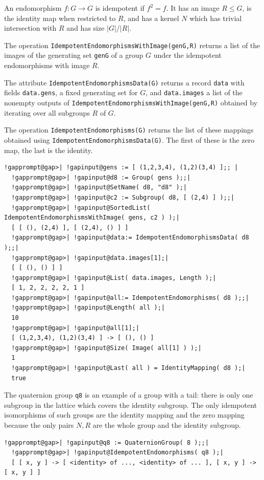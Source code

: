 \documentclass[a4paper,11pt]{report}
\begin{document}
{{{ An endomorphism $f\colon G \to G$ is idempotent if $f^2 = f$. It has an image $R \leq G$, is the identity map when restricted to $R$, and has a kernel $N$ which has trivial intersection with $R$ and has size $|G|/|R|$. 

 The operation \texttt{IdempotentEndomorphismsWithImage(genG,R)} returns a list of the images of the generating set \texttt{genG} of a group $G$ under the idempotent endomorphisms with image $R$. 

 The attribute \texttt{IdempotentEndomorphismsData(G)} returns a record \texttt{data} with fields \texttt{data.gens}, a fixed generating set for $G$, and \texttt{data.images} a list of the non\texttt{}empty outputs of \texttt{IdempotentEndomorphismsWithImage(genG,R)} obtained by iterating over all subgroups $R$ of $G$. 

 The operation \texttt{IdempotentEndomorphisms(G)} returns the list of these mappings obtained using \texttt{IdempotentEndomorphismsData(G)}. The first of these is the zero map, the last is the identity. 

 
\begin{Verbatim}[commandchars=!@|,fontsize=\small,frame=single,label=Example]
  !gapprompt@gap>| !gapinput@gens := [ (1,2,3,4), (1,2)(3,4) ];; |
  !gapprompt@gap>| !gapinput@d8 := Group( gens );;|
  !gapprompt@gap>| !gapinput@SetName( d8, "d8" );|
  !gapprompt@gap>| !gapinput@c2 := Subgroup( d8, [ (2,4) ] );;|
  !gapprompt@gap>| !gapinput@SortedList( IdempotentEndomorphismsWithImage( gens, c2 ) );|
  [ [ (), (2,4) ], [ (2,4), () ] ]
  !gapprompt@gap>| !gapinput@data:= IdempotentEndomorphismsData( d8 );;|
  !gapprompt@gap>| !gapinput@data.images[1];|
  [ [ (), () ] ]
  !gapprompt@gap>| !gapinput@List( data.images, Length );|
  [ 1, 2, 2, 2, 2, 1 ]
  !gapprompt@gap>| !gapinput@all:= IdempotentEndomorphisms( d8 );;|
  !gapprompt@gap>| !gapinput@Length( all );|
  10
  !gapprompt@gap>| !gapinput@all[1];|
  [ (1,2,3,4), (1,2)(3,4) ] -> [ (), () ]
  !gapprompt@gap>| !gapinput@Size( Image( all[1] ) );|
  1
  !gapprompt@gap>| !gapinput@Last( all ) = IdentityMapping( d8 );|
  true
\end{Verbatim}
 }

 The quaternion group \texttt{q8} is an example of a group with a tail: there is only one subgroup in the
lattice which covers the identity subgroup. The only idempotent isomorphisms
of such groups are the identity mapping and the zero mapping because the only
pairs $N,R$ are the whole group and the identity subgroup. 
\begin{Verbatim}[commandchars=!@|,fontsize=\small,frame=single,label=Example]
  !gapprompt@gap>| !gapinput@q8 := QuaternionGroup( 8 );;|
  !gapprompt@gap>| !gapinput@IdempotentEndomorphisms( q8 );|
  [ [ x, y ] -> [ <identity> of ..., <identity> of ... ], [ x, y ] -> [ x, y ] ]
\end{Verbatim}
 

}}
\end{document}

